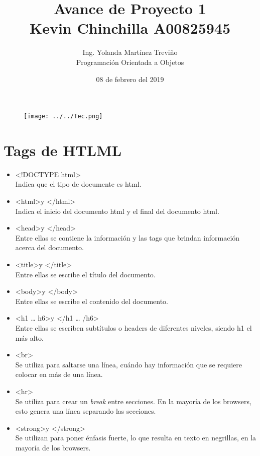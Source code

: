 \documentclass[12pt]{article}
\author{Ing. Yolanda Martínez Treviño \\ Programación Orientada a Objetos}
\title{\textbf{Avance de Proyecto 1} \\Kevin Chinchilla A00825945}
\date{08 de febrero del 2019}
\begin{document}
\begin{figure}[t]
\texttt{[image: ../../Tec.png]}
\centering
\end{figure}
\maketitle

\pagebreak

\section{Tags de HTLML}

\begin{itemize}
	\item \textless !DOCTYPE html\textgreater \\
		Indica que el tipo de documente es html.
	\item \textless html\textgreater y \textless /html\textgreater  \\
		Indica el inicio del documento html y el final del documento html.
	\item \textless head\textgreater  y \textless /head\textgreater  \\
		Entre ellas se contiene la información y las tags que brindan información acerca del documento.

	\item \textless title\textgreater  y \textless /title\textgreater \\
		Entre ellas se escribe el título del documento.

	\item \textless body\textgreater  y \textless /body\textgreater \\
		Entre ellas se escribe el contenido del documento.

	\item \textless h1 … h6\textgreater  y \textless /h1 … /h6\textgreater  \\
		Entre ellas se escriben subtítulos o headers de diferentes niveles, siendo h1 el más alto.

	\item \textless br\textgreater  \\
		Se utiliza para saltarse una línea, cuándo hay información que se requiere colocar en más de una línea.

	\item \textless hr\textgreater \\
		Se utiliza para crear un \textit{break} entre secciones. En la mayoría de los browsers, esto genera una línea separando las secciones.

	\item \textless strong\textgreater  y \textless /strong\textgreater  \\
		Se utilizan para poner énfasis fuerte, lo que resulta en texto en negrillas, en la mayoría de los browsers.

\end{itemize}
\end{document}
